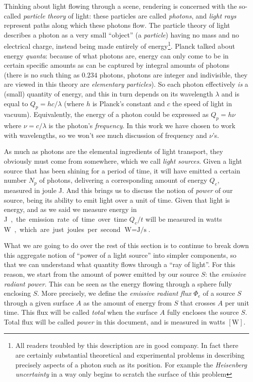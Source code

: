 Thinking about light flowing through a scene, rendering is concerned with the so-called
\textsl{particle theory} of light: these particles are called \textsl{photons}, 
and \textsl{light rays} represent paths along which these photons flow.
The particle theory of light describes a photon as a very small ``object'' 
(a \textsl{particle}) having no mass and no electrical charge, 
instead being made entirely of energy\footnote{
	All readers troubled by this description are in good company. In fact there are 
	certainly substantial theoretical and experimental problems in describing precisely
 	aspects of a photon such as its position. For example the \textsl{Heisenberg uncertainty}
 	in a way only begins to scratch the surface of this problem}. Planck talked about
energy \textsl{quanta}: because of what photons are, energy can only come to be in 
certain specific amounts as can be captured by integral amounts of photons (there is no
such thing as $0.234$ photons, photons are integer and indivisible, they are viewed in
this theory are \textsl{elementary particles}).
So each photon effectively \emph{is} a (small) quantity of energy, and this in turn 
depends on its wavelength $\lambda$ and is equal to $Q_p = hc/\lambda$ 
(where $h$ is Planck's constant and $c$ the speed of light in vacuum). Equivalently,
the energy of a photon could be expressed as $Q_p = h\nu$ where $\nu = c/\lambda$ is the
photon's \textsl{frequency}. In this work we have chosen to work with wavelengths, so we won't
see much discussion of frequency and $\nu$'s.

As much as photons are the elemental ingredients of light transport, 
they obviously must come from somewhere, which we call \textsl{light sources}.
Given a light source that has been shining for a period of time, it will have emitted a
certain number $N_p$ of photons, delivering a corresponding amount of energy $Q_e$, measured in
joule \unit{\joule}. 
And this brings us to discuss the notion of \textsl{power} of our source, being its ability
to emit light over a unit of time. Given that light is energy, and as we said we measure energy
in \unit\joule, the emission rate of time over time $Q_e/t$ will be measured in watts \unit\watt,
which are just joules per second $\unit\watt = \unit{\joule\per\second}$.

What we are going to do over the rest of this section is to continue to break down 
this aggregate notion of ``power of a light source'' into simpler components, so 
that we can understand what quantity flows through a ``ray of light''.
For this reason, we start from the amount of power emitted by our source $S$:
the \textsl{emissive radiant power}.
This can be seen as the energy flowing through a sphere fully enclosing $S$.
More precisely, we define the \textsl{emissive radiant flux} $\Phi_e$ of a
source $S$ through a given surface $A$ as the amount of energy from $S$ that
crosses $A$ per unit time. This flux will be called \textsl{total} when the surface
$A$ fully encloses the source $S$. Total flux will be called \textsl{power} in
this document, and is measured in watts $[\unit{\watt}]$.

